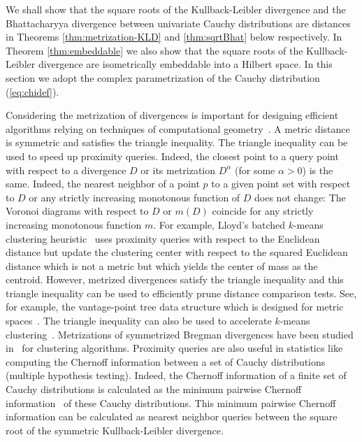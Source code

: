 \documentclass[journal]{IEEEtran}
\begin{document}
We shall show that the square roots of the Kullback-Leibler divergence and the  Bhattacharyya divergence between univariate Cauchy distributions are distances in Theorems \ref{thm:metrization-KLD} and \ref{thm:sqrtBhat} below respectively. 
In Theorem \ref{thm:embeddable}  we also show that the square roots of the Kullback-Leibler divergence are isometrically embeddable into a Hilbert space. 
In this section we adopt the complex parametrization of the Cauchy distribution (\eqref{eq:chidef}). 

 
Considering the metrization of divergences is important for designing efficient algorithms
relying on techniques of computational geometry~\cite{CG-1997}.
A metric distance is symmetric and satisfies the triangle inequality.
The triangle inequality can be used to speed up proximity queries.
Indeed, the closest point to a query point with respect to a divergence $D$ or its metrization
$D^\alpha$ (for some $\alpha>0$) is the same. Indeed,
the nearest neighbor of a point $p$ to a given point set with respect to $D$ or any strictly increasing monotonous function of $D$ does not change: The Voronoi diagrams with respect to $D$ or $m(D)$ coincide for any strictly increasing monotonous function $m$.
For example, Lloyd's batched $k$-means clustering heuristic~\cite{Lloyd-1982} uses proximity queries with respect to the Euclidean distance
 but update the clustering center with respect to the squared Euclidean distance which is not a metric but which yields the center of mass as the centroid.
However, metrized divergences satisfy the triangle inequality and this triangle inequality
can be used to efficiently prune distance comparison tests.
See, for example, the vantage-point tree data structure which is designed for metric spaces~\cite{VPtree-1993}.
The triangle inequality can also be used to accelerate $k$-means clustering~\cite{TriangleIneqKMeans-2003}.
Metrizations of symmetrized Bregman divergences have been studied in~\cite{acharyya2013bregman} for clustering algorithms.
Proximity queries are also useful in statistics like computing the Chernoff information between a set of Cauchy distributions (multiple hypothesis testing).
Indeed, the Chernoff information of a finite set of Cauchy distributions is calculated
as the minimum pairwise Chernoff information~\cite{multipleHT-2008,multipleChernoff-2016} of these Cauchy distributions.
This minimum pairwise Chernoff information can be calculated as nearest neighbor queries between the square root of the symmetric Kullback-Leibler divergence.
  
\end{document}
